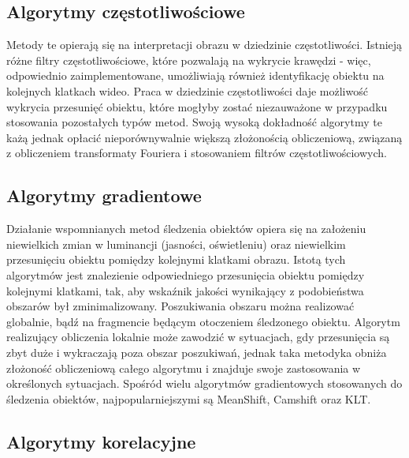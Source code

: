 \subsection{Algorytmy częstotliwościowe}

Metody te opierają się na interpretacji obrazu w dziedzinie częstotliwości. 
Istnieją różne filtry częstotliwościowe, które pozwalają na wykrycie krawędzi - więc, odpowiednio zaimplementowane, umożliwiają również identyfikację obiektu na kolejnych klatkach wideo. %
Praca w dziedzinie częstotliwości daje możliwość wykrycia przesunięć obiektu, które mogłyby zostać niezauważone w przypadku stosowania pozostałych typów metod. 
Swoją wysoką dokładność algorytmy te każą jednak opłacić nieporównywalnie większą złożonością obliczeniową, związaną z obliczeniem transformaty Fouriera i stosowaniem filtrów częstotliwościowych. %

\subsection{Algorytmy gradientowe}

Działanie wspomnianych metod śledzenia obiektów opiera się na założeniu niewielkich zmian w luminancji (jasności, oświetleniu) oraz niewielkim przesunięciu obiektu pomiędzy kolejnymi klatkami obrazu. %
Istotą tych algorytmów jest znalezienie odpowiedniego przesunięcia obiektu pomiędzy kolejnymi klatkami, tak, aby wskaźnik jakości wynikający z podobieństwa obszarów był zminimalizowany. 
Poszukiwania obszaru można realizować globalnie, bądź na fragmencie będącym otoczeniem śledzonego obiektu. 
Algorytm realizujący obliczenia lokalnie może zawodzić w sytuacjach, gdy przesunięcia są zbyt duże i wykraczają poza obszar poszukiwań, jednak taka metodyka obniża złożoność obliczeniową całego algorytmu i znajduje swoje zastosowania w określonych sytuacjach. %
Spośród wielu algorytmów gradientowych stosowanych do śledzenia obiektów, najpopularniejszymi są MeanShift, Camshift oraz KLT. %

\subsection{Algorytmy korelacyjne}

